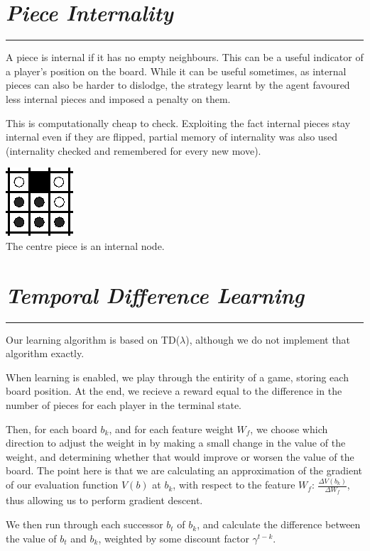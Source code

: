 \documentclass[10pt]{report}
\begin{document}
\begin{multicols}{2}
\section*{\emph{\textmd{Piece Internality}}}
\hrule

A piece is internal if it has no empty neighbours. This can be a useful indicator of a player's position on the board. While it can be useful sometimes, as internal pieces can also be harder to dislodge, the strategy learnt by the agent favoured less internal pieces and imposed a penalty on them.

This is computationally cheap to check. Exploiting the fact internal pieces stay internal even if they are flipped, partial memory of internality was also used (internality checked and remembered for every new move).

\begin{center}
\includegraphics[scale=0.50]{internality.PNG}\\
The centre piece is an internal node.
\end{center}
\section*{\emph{Temporal Difference Learning}}
\hrule

Our learning algorithm is based on TD($\lambda$), although we do not implement that algorithm exactly.

When learning is enabled, we play through the entirity of a game, storing each board position. At the end, we recieve a reward equal to the difference in the number of pieces for each player in the terminal state.

Then, for each board $b_k$, and for each feature weight $W_f$, we choose which direction to adjust the weight in by making a small change in the value of the weight, and determining whether that would improve or worsen the value of the board. The point here is that we are calculating an approximation of the gradient of our evaluation function $V(b)$ at $b_k$, with respect to the feature $W_f$: $\frac{\Delta V(b_k)}{\Delta W_f}$, thus allowing us to perform gradient descent.

We then run through each successor $b_t$ of $b_k$, and calculate the difference between the value of $b_t$ and $b_k$, weighted by some discount factor $\gamma^{t-k}$.


\end{multicols}
\end{document}
